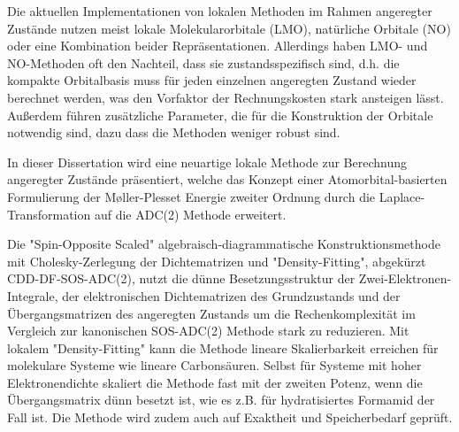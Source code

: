 Die aktuellen Implementationen von lokalen Methoden im Rahmen angeregter Zustände nutzen meist lokale Molekularorbitale (LMO), natürliche Orbitale (NO) oder eine Kombination beider Repräsentationen.
Allerdings haben LMO- und NO-Methoden oft den Nachteil, dass sie zustandsspezifisch sind, d.h. die kompakte Orbitalbasis muss für jeden einzelnen angeregten Zustand wieder berechnet werden, was den Vorfaktor der Rechnungskosten stark ansteigen lässt. 
Au{\ss}erdem führen zusätzliche Parameter, die für die Konstruktion der Orbitale notwendig sind, dazu dass die Methoden weniger robust sind. 

In dieser Dissertation wird eine neuartige lokale Methode zur Berechnung angeregter Zustände präsentiert, welche das Konzept einer Atomorbital-basierten Formulierung der M{\o}ller-Plesset Energie zweiter Ordnung durch die Laplace-Transformation auf die ADC(2) Methode erweitert.

Die "{}Spin-Opposite Scaled"{} algebraisch-diagrammatische Konstruktionsmethode mit Cholesky-Zerlegung der Dichtematrizen und "{}Density-Fitting"{}, abgekürzt CDD-DF-SOS-ADC(2), nutzt die dünne Besetzungsstruktur der Zwei-Elektronen-Integrale, der elektronischen Dichtematrizen des Grundzustands und der Übergangsmatrizen des angeregten Zustands um die Rechenkomplexität im Vergleich zur kanonischen SOS-ADC(2) Methode stark zu reduzieren.
Mit lokalem "{}Density-Fitting"{} kann die Methode lineare Skalierbarkeit erreichen für molekulare Systeme wie lineare Carbonsäuren. 
Selbst für Systeme mit hoher Elektronendichte skaliert die Methode fast mit der zweiten Potenz, wenn die Übergangsmatrix dünn besetzt ist, wie es z.B. für hydratisiertes Formamid der Fall ist.
Die Methode wird zudem auch auf Exaktheit und Speicherbedarf geprüft. 


